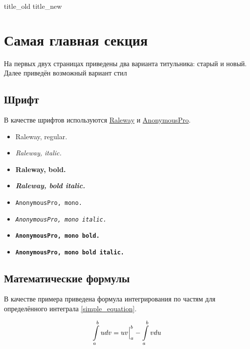 \documentclass[12pt,a4paper]{article}
\begin{document}
{title_old} %
{title_new} %

\tableofcontents %


\section{Самая главная секция}

На первых двух страницах приведены два варианта титульника: старый и новый. Далее приведён возможный вариант стил


\subsection{Шрифт}

В качестве шрифтов используются \href{https://fonts.google.com/specimen/Raleway}{Raleway} и \href{https://fonts.google.com/specimen/Anonymous+Pro}{AnonymousPro}.

\begin{multicols}{2}
	\begin{itemize}
		\item Raleway, regular.
		\item \textit{Raleway, italic.}
		\item \textbf{Raleway, bold.}
		\item \textbf{\textit{Raleway, bold italic.}}
		\item \texttt{AnonymousPro, mono.}
		\item \textit{\texttt{AnonymousPro, mono italic.}}
		\item \textbf{\texttt{AnonymousPro, mono bold.}}
		\item \textbf{\texttt{AnonymousPro, mono bold italic.}}
	\end{itemize}
\end{multicols}


\subsection{Математические формулы}


В качестве примера приведена формула интегрирования по частям для определённого интеграла \eqref{simple_equation}.

\begin{equation} \label{simple_equation}
\displaystyle\int\limits_a^b u dv = uv \Big|_a^b - \displaystyle\int\limits_a^b v du
\end{equation} 
\end{document}
